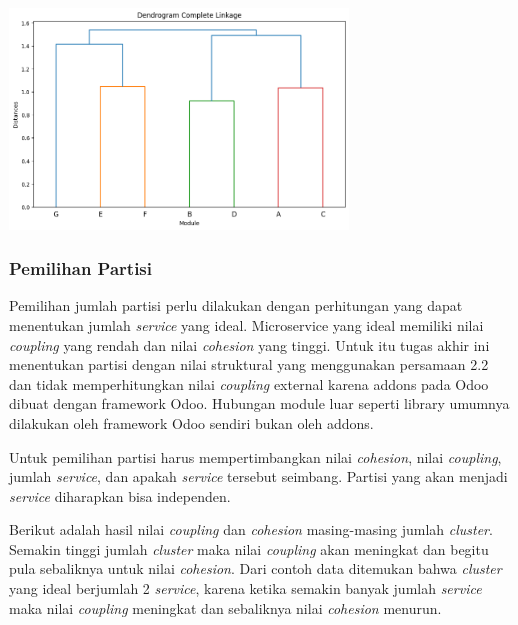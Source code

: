 \begin{center}
	\includegraphics[width=9cm]{img/bab_3/completeLink.png}
	\label{fig:asd}
\end{center}

\subsubsection{Pemilihan Partisi}
Pemilihan jumlah partisi perlu dilakukan dengan perhitungan yang dapat menentukan jumlah \textit{service} yang ideal. Microservice yang ideal memiliki nilai \textit{coupling} yang rendah dan nilai \textit{cohesion} yang tinggi. Untuk itu tugas akhir ini menentukan partisi dengan nilai struktural yang menggunakan persamaan 2.2 dan tidak memperhitungkan nilai \textit{coupling} external karena addons pada Odoo dibuat dengan framework Odoo. Hubungan module luar seperti library umumnya dilakukan oleh framework Odoo sendiri bukan oleh addons.

Untuk pemilihan partisi harus mempertimbangkan nilai \textit{cohesion}, nilai \textit{coupling}, jumlah \textit{service}, dan apakah \textit{service} tersebut seimbang. Partisi yang akan menjadi \textit{service} diharapkan bisa independen. 

Berikut adalah hasil nilai \textit{coupling} dan \textit{cohesion} masing-masing jumlah \textit{cluster}. Semakin tinggi jumlah \textit{cluster} maka nilai \textit{coupling} akan meningkat dan begitu pula sebaliknya untuk nilai \textit{cohesion}. Dari contoh data ditemukan bahwa \textit{cluster} yang ideal berjumlah 2 \textit{service}, karena ketika semakin banyak jumlah \textit{service} maka nilai \textit{coupling} meningkat dan sebaliknya nilai \textit{cohesion} menurun.

